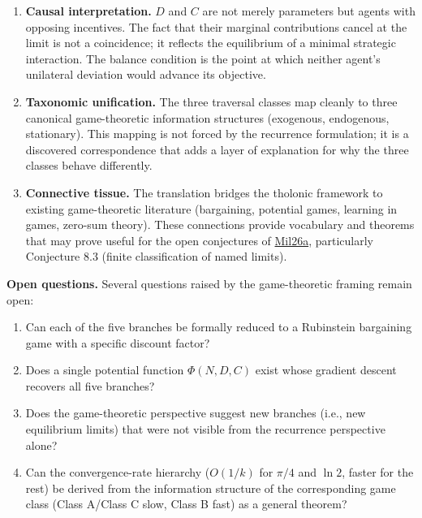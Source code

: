 \documentclass[
  11pt,
  letterpaper,
]{article}
\providecommand{\tightlist}{%
  \setlength{\itemsep}{0pt}\setlength{\parskip}{0pt}}
\begin{document}
\begin{enumerate}
\def\labelenumi{\arabic{enumi}.}
\item
  \textbf{Causal interpretation.} \(D\) and \(C\) are not merely
  parameters but agents with opposing incentives. The fact that their
  marginal contributions cancel at the limit is not a coincidence; it
  reflects the equilibrium of a minimal strategic interaction. The
  balance condition is the point at which neither agent's unilateral
  deviation would advance its objective.
\item
  \textbf{Taxonomic unification.} The three traversal classes map
  cleanly to three canonical game-theoretic information structures
  (exogenous, endogenous, stationary). This mapping is not forced by the
  recurrence formulation; it is a discovered correspondence that adds a
  layer of explanation for why the three classes behave differently.
\item
  \textbf{Connective tissue.} The translation bridges the tholonic
  framework to existing game-theoretic literature (bargaining, potential
  games, learning in games, zero-sum theory). These connections provide
  vocabulary and theorems that may prove useful for the open conjectures
  of
  \href{https://github.com/baardev/truevalue/blob/main/docnav/Research/papers/1_recursive-tholonic-five-constants/1_recursive-tholonic-five-constants.pdf}{Mil26a},
  particularly Conjecture 8.3 (finite classification of named limits).
\end{enumerate}

\textbf{Open questions.} Several questions raised by the game-theoretic
framing remain open:

\begin{enumerate}
\def\labelenumi{\arabic{enumi}.}
\tightlist
\item
  Can each of the five branches be formally reduced to a Rubinstein
  bargaining game with a specific discount factor?
\item
  Does a single potential function \(\Phi(N, D, C)\) exist whose
  gradient descent recovers all five branches?
\item
  Does the game-theoretic perspective suggest new branches (i.e., new
  equilibrium limits) that were not visible from the recurrence
  perspective alone?
\item
  Can the convergence-rate hierarchy (\(O(1/k)\) for \(\pi/4\) and
  \(\ln 2\), faster for the rest) be derived from the information
  structure of the corresponding game class (Class A/Class C slow, Class
  B fast) as a general theorem?
\end{enumerate}
\end{document}
